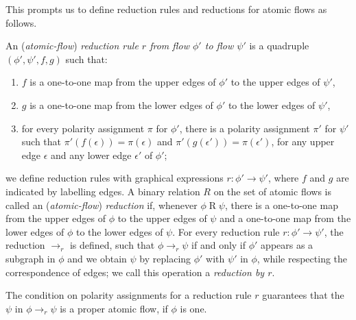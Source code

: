 This prompts us to define reduction rules and reductions for atomic flows as follows.

\begin{definition}
An (\emph{atomic-flow}) \emph{reduction rule $r$ from flow $\phi'$ to flow $\psi'$} is a quadruple $(\phi',\psi',f,g)$ such that:
\begin{enumerate}
\item $f$ is a one-to-one map from the upper edges of $\phi'$ to the upper edges of $\psi'$,
\item $g$ is a one-to-one map from the lower edges of $\phi'$ to the lower edges of $\psi'$,
\item for every polarity assignment $\pi$ for $\phi'$, there is a polarity assignment $\pi'$ for $\psi'$ such that $\pi'(f(\epsilon))=\pi(\epsilon)$ and $\pi'(g(\epsilon'))=\pi(\epsilon')$, for any upper edge $\epsilon$ and any lower edge $\epsilon'$ of $\phi'$;
\end{enumerate}
we define reduction rules with graphical expressions $r\colon\phi'\to\psi'$, where $f$ and $g$ are indicated by labelling edges. A binary relation $R$ on the set of atomic flows is called an (\emph{atomic-flow}) \emph{reduction} if, whenever $\phi\mathrel{R}\psi$, there is a one-to-one map from the upper edges of $\phi$ to the upper edges of $\psi$ and a one-to-one map from the lower edges of $\phi$ to the lower edges of $\psi$. For every reduction rule $r\colon\phi'\to\psi'$, the reduction ${\to_r}$ is defined, such that $\phi\to_r\psi$ if and only if $\phi'$ appears as a subgraph in $\phi$ and we obtain $\psi$ by replacing $\phi'$ with $\psi'$ in $\phi$, while respecting the correspondence of edges; we call this operation a \emph{reduction by $r$}.
\end{definition}

\begin{remark}
The condition on polarity assignments for a reduction rule $r$ guarantees that the $\psi$ in $\phi\to_r\psi$ is a proper atomic flow, if $\phi$ is one.
\end{remark}

